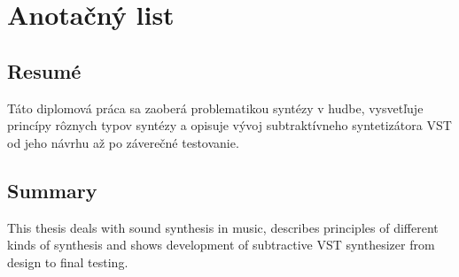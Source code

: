 \thispagestyle{empty}
\vspace*{6cm}

\section*{Anotačný list}

\subsection*{Resumé}

Táto diplomová práca sa zaoberá problematikou syntézy v hudbe, vysvetľuje princípy rôznych typov syntézy a opisuje vývoj subtraktívneho syntetizátora VST od jeho návrhu až po záverečné testovanie.

\subsection*{Summary}

This thesis deals with sound synthesis in music, describes principles of different kinds of synthesis and shows development of subtractive VST synthesizer from design to final testing.